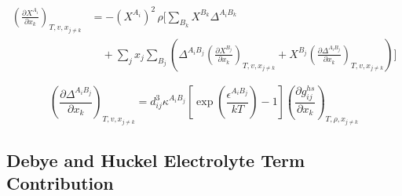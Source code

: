 \documentclass[12pt, letterpaper]{article}
\begin{document}

\begin{equation}
    \begin{aligned}
        \left(\frac{\partial X^{A_{i}}}{\partial x_{k}}\right)_{T,v,x_{j\neq k}}
        &=
        -(X^{A_{i}})^{2}\,\rho
        \Bigg[
        \sum_{B_{k}}X^{B_{k}}\Delta^{A_{i}B_{k}}
        \\
        &\quad +
        \sum_{j}x_{j}\sum_{B_{j}}
        \left(
        \Delta^{A_{i}B_{j}}\left(\frac{\partial X^{B_{j}}}{\partial x_{k}}\right)_{T,v,x_{j\neq k}}
        +
        X^{B_{j}}\left(\frac{\partial \Delta^{A_{i}B_{j}}}{\partial x_{k}}\right)_{T,v,x_{j\neq k}}
        \right)
        \Bigg]
    \end{aligned}
    \label{eq:dx_assoc_dxk}
\end{equation}


\begin{equation}
    \left(\frac{\partial \Delta^{A_{i}B_{j}}}{\partial x_{k}}\right)_{T,v,x_{j\neq k}}
    =
    d_{ij}^{3}\kappa^{A_{i}B_{j}}
    \left[\exp\!\left(\frac{\epsilon^{A_{i}B_{j}}}{kT}\right)-1\right]
    \left(\frac{\partial g_{ij}^{hs}}{\partial x_{k}}\right)_{T,\rho,x_{j\neq k}}
    \label{eq:ddelta_assoc_dxk}
\end{equation}

\subsection{Debye and Huckel Electrolyte Term Contribution}



\end{document}
